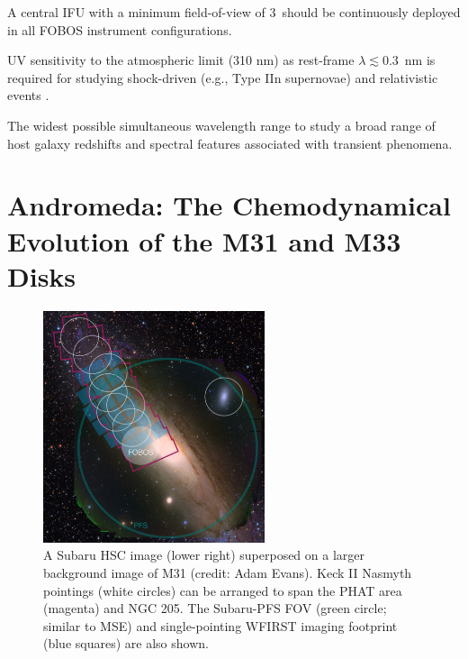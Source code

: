 \documentclass[11pt,a4paper,twoside,onecolumn,openany,final,oldfontcommands]{memoir}
\begin{document}
\medskip
\begin{sciencerequirement}
\reqitem A central IFU with a minimum field-of-view of 3\arcsec\ should be continuously deployed in all FOBOS instrument configurations.

\reqitem UV sensitivity to the atmospheric limit (310 nm) as rest-frame $\lambda \lesssim 0.3$~nm is required for studying shock-driven (e.g., Type IIn supernovae) and relativistic events \citep[e.g., the atypically bright Type Ib supernova AT 2018cow;][]{margutti2019}.

\reqitem The widest possible simultaneous wavelength range to study a broad range of host galaxy redshifts and spectral features associated with transient phenomena.  
\end{sciencerequirement}




\section{Andromeda: The Chemodynamical Evolution of the M31 and M33 Disks}
\label{sec:m31disk}

\begin{figure}
\begin{center}
\includegraphics[width=0.58\textwidth]{figs/M31_footprint_v3.jpg}
\end{center}
\caption[M31 pointing distribution]{A Subaru HSC image (lower right) superposed on a larger background image of M31 (credit: Adam Evans).  Keck II Nasmyth pointings (white circles) can be arranged to span the PHAT area (magenta) and NGC 205.  The Subaru-PFS FOV (green circle; similar to MSE) and single-pointing WFIRST imaging footprint (blue squares) are also shown.}
\label{fig:M31}    
\end{figure}
\end{document}
